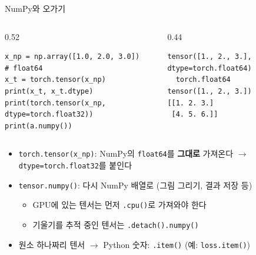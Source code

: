 \documentclass[aspectratio=169,11pt]{beamer}
\newcommand{\code}[1]{\texttt{#1}}
\begin{document}
\begin{frame}[fragile]{NumPy와 오가기}
\begin{columns}[T,onlytextwidth]
\begin{column}{0.52\textwidth}
\begin{lstlisting}
x_np = np.array([1.0, 2.0, 3.0])   # float64
x_t = torch.tensor(x_np)
print(x_t, x_t.dtype)
print(torch.tensor(x_np, dtype=torch.float32))
print(a.numpy())
\end{lstlisting}
\end{column}
\begin{column}{0.44\textwidth}
\begin{lstlisting}[style=outstyle]
tensor([1., 2., 3.], dtype=torch.float64)
  torch.float64
tensor([1., 2., 3.])
[[1. 2. 3.]
 [4. 5. 6.]]
\end{lstlisting}
\end{column}
\end{columns}
\vskip2mm
\begin{itemize}
\item \code{torch.tensor(x\_np)}: NumPy의 \code{float64}를 \textbf{그대로} 가져온다 $\to$ \code{dtype=torch.float32}를 붙인다
\item \code{tensor.numpy()}: 다시 NumPy 배열로 (그림 그리기, 결과 저장 등)
\begin{itemize}
\item GPU에 있는 텐서는 먼저 \code{.cpu()}로 가져와야 한다
\item 기울기를 추적 중인 텐서는 \code{.detach().numpy()}
\end{itemize}
\item 원소 하나짜리 텐서 $\to$ Python 숫자: \code{.item()} (예: \code{loss.item()})
\end{itemize}
\end{frame}
\end{document}
